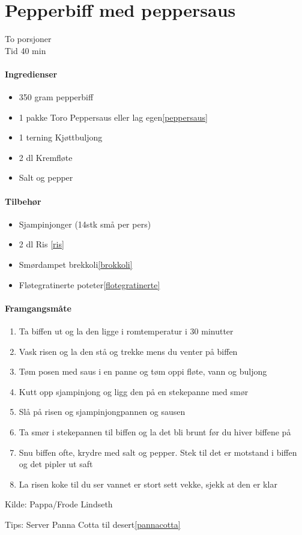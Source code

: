 \section{﻿Pepperbiff med peppersaus}
To porsjoner\\
Tid 40 min

\paragraph{Ingredienser}
\begin{itemize}[noitemsep]
	\item 350 gram  pepperbiff
	\item 1 pakke Toro Peppersaus eller lag egen\ref{peppersaus}
	\item 1 terning Kjøttbuljong
	\item 2 dl Kremfløte
	\item Salt og pepper
\end{itemize}

\paragraph{Tilbehør}
\begin{itemize}[noitemsep]
	\item Sjampinjonger (14stk små per pers)
	\item 2 dl Ris \ref{ris}
	\item Smørdampet brekkoli\ref{brokkoli}
	\item Fløtegratinerte poteter\ref{flotegratinerte}
\end{itemize}

\paragraph{Framgangsmåte}
\begin{enumerate}[noitemsep]
	\item Ta biffen ut og la den ligge i romtemperatur i 30 minutter
	\item Vask risen og la den stå og trekke mens du venter på biffen
	\item Tøm posen med saus i en panne og tøm oppi fløte, vann og buljong
	\item Kutt opp sjampinjong og ligg den på en stekepanne med smør
	\item Slå på risen og sjampinjongpannen og sausen
	\item Ta smør i stekepannen til biffen og la det bli brunt før du hiver biffene på
	\item Snu biffen ofte, krydre med salt og pepper. Stek til det er motstand i biffen og det pipler ut saft
	\item La risen koke til du ser vannet er stort sett vekke, sjekk at den er klar
\end{enumerate}

Kilde: Pappa/Frode Lindseth

Tips: Server Panna Cotta til desert\ref{pannacotta}
